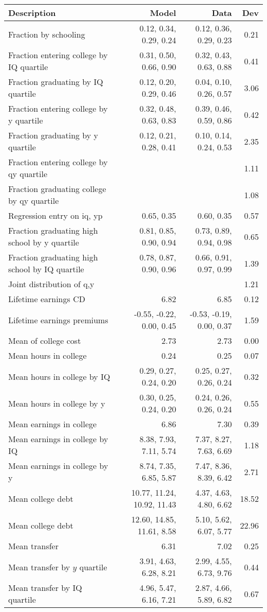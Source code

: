 \begin{tabular}{lrrr}
\hline
Description & Model  & Data  & Dev  \\ 
\hline
Fraction by schooling & 0.12, 0.34, 0.29, 0.24  & 0.12, 0.36, 0.29, 0.23  & 0.21  \\ 
Fraction entering college by IQ quartile & 0.31, 0.50, 0.66, 0.90  & 0.32, 0.43, 0.63, 0.88  & 0.41  \\ 
Fraction graduating by IQ quartile & 0.12, 0.20, 0.29, 0.46  & 0.04, 0.10, 0.26, 0.57  & 3.06  \\ 
Fraction entering college by y quartile & 0.32, 0.48, 0.63, 0.83  & 0.39, 0.46, 0.59, 0.86  & 0.42  \\ 
Fraction graduating by y quartile & 0.12, 0.21, 0.28, 0.41  & 0.10, 0.14, 0.24, 0.53  & 2.35  \\ 
Fraction entering college by qy quartile &   &   & 1.11  \\ 
Fraction graduating college by qy quartile &   &   & 1.08  \\ 
Regression entry on iq, yp & 0.65, 0.35  & 0.60, 0.35  & 0.57  \\ 
Fraction graduating high school by y quartile & 0.81, 0.85, 0.90, 0.94  & 0.73, 0.89, 0.94, 0.98  & 0.65  \\ 
Fraction graduating high school by IQ quartile & 0.78, 0.87, 0.90, 0.96  & 0.66, 0.91, 0.97, 0.99  & 1.39  \\ 
Joint distribution of q,y &   &   & 1.21  \\ 
Lifetime earnings CD & 6.82  & 6.85  & 0.12  \\ 
Lifetime earnings premiums & -0.55, -0.22, 0.00, 0.45  & -0.53, -0.19, 0.00, 0.37  & 1.59  \\ 
Mean of college cost & 2.73  & 2.73  & 0.00  \\ 
Mean hours in college & 0.24  & 0.25  & 0.07  \\ 
Mean hours in college by IQ & 0.29, 0.27, 0.24, 0.20  & 0.25, 0.27, 0.26, 0.24  & 0.32  \\ 
Mean hours in college by y & 0.30, 0.25, 0.24, 0.20  & 0.24, 0.26, 0.26, 0.24  & 0.55  \\ 
Mean earnings in college & 6.86  & 7.30  & 0.39  \\ 
Mean earnings in college by IQ & 8.38, 7.93, 7.11, 5.74  & 7.37, 8.27, 7.63, 6.69  & 1.18  \\ 
Mean earnings in college by y & 8.74, 7.35, 6.85, 5.87  & 7.47, 8.36, 8.39, 6.42  & 2.71  \\ 
Mean college debt & 10.77, 11.24, 10.92, 11.43  & 4.37, 4.63, 4.80, 6.62  & 18.52  \\ 
Mean college debt & 12.60, 14.85, 11.61, 8.58  & 5.10, 5.62, 6.07, 5.77  & 22.96  \\ 
Mean transfer & 6.31  & 7.02  & 0.25  \\ 
Mean transfer by $y$ quartile & 3.91, 4.63, 6.28, 8.21  & 2.99, 4.55, 6.73, 9.76  & 0.44  \\ 
Mean transfer by IQ quartile & 4.96, 5.47, 6.16, 7.21  & 2.87, 4.66, 5.89, 6.82  & 0.67  \\ 
\hline
\end{tabular}%
